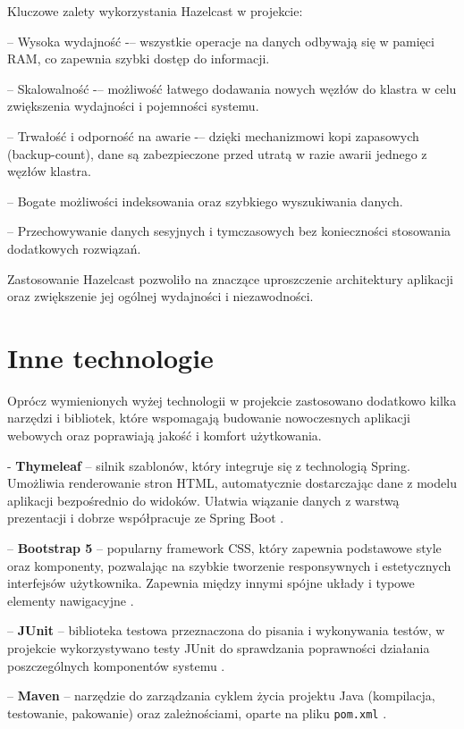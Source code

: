 Kluczowe zalety wykorzystania Hazelcast w projekcie:

– Wysoka wydajność -– wszystkie operacje na danych odbywają się w pamięci RAM, co zapewnia szybki dostęp do informacji.

– Skalowalność -– możliwość łatwego dodawania nowych węzłów do klastra w celu zwiększenia wydajności i pojemności systemu.

– Trwałość i odporność na awarie -– dzięki mechanizmowi kopi zapasowych (backup-count), dane są zabezpieczone przed utratą w razie awarii jednego z węzłów klastra.

– Bogate możliwości indeksowania oraz szybkiego wyszukiwania danych.

– Przechowywanie danych sesyjnych i tymczasowych bez konieczności stosowania dodatkowych rozwiązań.

Zastosowanie Hazelcast pozwoliło na znaczące uproszczenie architektury aplikacji oraz zwiększenie jej ogólnej wydajności i niezawodności.

\section{Inne technologie}

Oprócz wymienionych wyżej technologii w projekcie zastosowano dodatkowo kilka narzędzi i bibliotek, które wspomagają budowanie nowoczesnych aplikacji webowych oraz poprawiają jakość i komfort użytkowania.

- \textbf{Thymeleaf} –  silnik szablonów, który integruje się z technologią Spring. Umożliwia renderowanie stron HTML, automatycznie dostarczając dane z modelu aplikacji bezpośrednio do widoków. Ułatwia wiązanie danych z warstwą prezentacji i dobrze współpracuje ze Spring Boot \cite{thymeleaf-docs}.

– \textbf{Bootstrap 5} – popularny framework CSS, który zapewnia podstawowe style oraz komponenty, pozwalając na szybkie tworzenie responsywnych i estetycznych interfejsów użytkownika. Zapewnia między innymi spójne układy i typowe elementy nawigacyjne \cite{bootstrap-docs}.

– \textbf{JUnit} – biblioteka testowa przeznaczona do pisania i wykonywania testów, w projekcie wykorzystywano testy JUnit do sprawdzania poprawności działania poszczególnych komponentów systemu \cite{junit-docs}.


– \textbf{Maven} – narzędzie do zarządzania cyklem życia projektu Java (kompilacja, testowanie, pakowanie) oraz zależnościami, oparte na pliku \texttt{pom.xml} \cite{maven-docs}.

